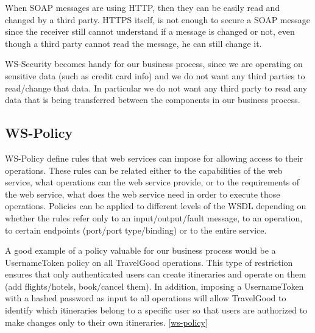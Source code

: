When SOAP messages are using HTTP, then they can be easily read and changed by a third party. HTTPS itself, is not enough to secure a SOAP message since the receiver still cannot understand if a message is changed or not, even though a third party cannot read the message, he can still change it. 

WS-Security becomes handy for our business process, since we are operating on sensitive data (such as credit card info) and we do not want any third parties to read/change that data. In particular we do not want any third party to read any data that is being transferred between the components in our business process. 

\subsection*{WS-Policy}

WS-Policy define rules that web services can impose for allowing access to their operations. These rules can be related either to the capabilities of the web service, what operations can the web service provide, or to the requirements of the web service, what does the web service need in order to execute those operations.
Policies can be applied to different levels of the WSDL depending on whether the rules refer only to an input/output/fault message, to an operation, to certain endpoints (port/port type/binding) or to the entire service.
 
A good example of a policy valuable for our business process would be a UsernameToken policy on all TravelGood operations. This type of restriction ensures that only authenticated users can create itineraries and operate on them (add flights/hotels, book/cancel them). In addition, imposing a UsernameToken with a hashed password as input to all operations will allow TravelGood to identify which itineraries belong to a specific user so that users are authorized to make changes only to their own itineraries. \ref{ws-policy}